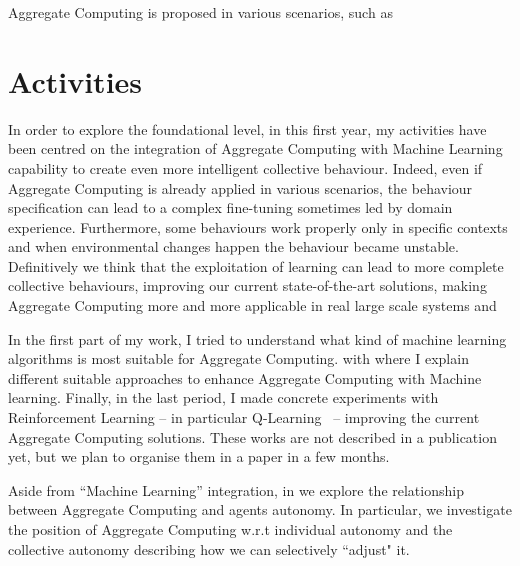 \documentclass[11pt]{article}
\begin{document}
%
Aggregate Computing is proposed in various scenarios, 
 such as 

\section{Activities}
In order to explore the foundational level, in this first year, 
 my activities have been centred on the integration of Aggregate Computing 
 with Machine Learning capability 
 to create even more intelligent collective behaviour.
%
Indeed, even if Aggregate Computing is already applied in various scenarios,
 the behaviour specification can lead to
 a complex fine-tuning sometimes led by domain experience.
%
Furthermore, some behaviours work properly only in specific contexts and when environmental
 changes happen the behaviour became unstable.
%
Definitively we think that the exploitation of 
 learning can lead to more complete collective behaviours, 
 improving our current state-of-the-art solutions, making Aggregate 
 Computing more and more applicable in real large scale systems
 and 

In the first part of my work, I tried to understand what 
 kind of machine learning algorithms is most suitable for Aggregate Computing.
%
 with \textit{} where I explain different suitable approaches
 to enhance Aggregate Computing with Machine learning.
%
Finally, in the last period, I made concrete experiments with 
 Reinforcement Learning -- in particular Q-Learning~\cite{watkins1992q} -- 
 improving the current Aggregate Computing solutions. 
 These works are not described in a publication yet, but we plan to organise them in a paper in a 
 few months.

Aside from ``Machine Learning'' integration, in \textit{} 
 we explore the relationship between Aggregate Computing and agents autonomy. In particular, 
 we investigate the position of Aggregate Computing w.r.t individual autonomy and the collective autonomy describing how we can selectively ``adjust" it. 
\end{document}
